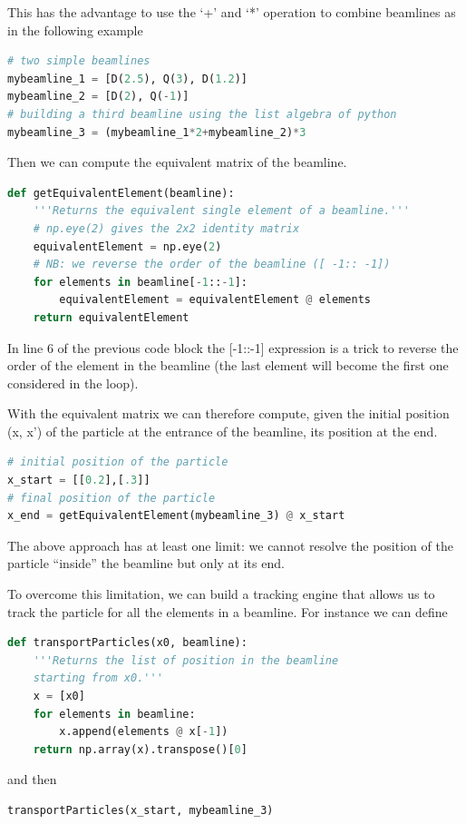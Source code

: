 \documentclass{article}
\begin{document}
This has the advantage to use the `+' and `*' operation to combine beamlines as in the following example

\begin{lstlisting}[language=Python]
# two simple beamlines
mybeamline_1 = [D(2.5), Q(3), D(1.2)]
mybeamline_2 = [D(2), Q(-1)]
# building a third beamline using the list algebra of python
mybeamline_3 = (mybeamline_1*2+mybeamline_2)*3
\end{lstlisting}

Then we can compute the equivalent matrix of the beamline.

\begin{lstlisting}[language=Python]
def getEquivalentElement(beamline):
    '''Returns the equivalent single element of a beamline.'''
    # np.eye(2) gives the 2x2 identity matrix
    equivalentElement = np.eye(2)
    # NB: we reverse the order of the beamline ([ -1:: -1])
    for elements in beamline[-1::-1]:
        equivalentElement = equivalentElement @ elements
    return equivalentElement
\end{lstlisting}

In line 6 of the previous code block the {\rm [-1::-1]} expression is a trick to reverse the order of the element in the beamline (the last element will become the first one considered in the loop).

With the equivalent matrix we can therefore compute, given the initial position (x, x') of the particle at the entrance of the beamline, its position at the end.
\begin{lstlisting}[language=Python]
# initial position of the particle
x_start = [[0.2],[.3]]
# final position of the particle
x_end = getEquivalentElement(mybeamline_3) @ x_start
\end{lstlisting}

The above approach has at least one limit: we cannot resolve the position of the particle ``inside'' the beamline but only at its end.

To overcome this limitation, we can build a tracking engine that allows us to track the particle for all the elements in a beamline. For instance we can define 

\begin{lstlisting}[language=Python]
def transportParticles(x0, beamline):
    '''Returns the list of position in the beamline 
    starting from x0.'''
    x = [x0]
    for elements in beamline:
        x.append(elements @ x[-1])
    return np.array(x).transpose()[0]
\end{lstlisting}
and then
\begin{lstlisting}[language=Python]
transportParticles(x_start, mybeamline_3)
\end{lstlisting}
\end{document}

